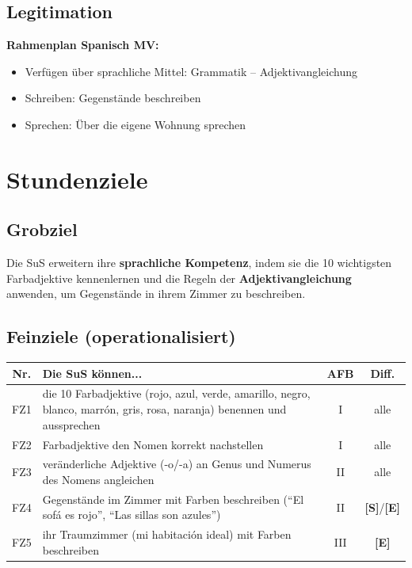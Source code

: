 \documentclass[11pt,a4paper]{article}
\newcommand{\Std}{\textcolor{standard}{\textbf{[S]}}}
\newcommand{\E}{\textcolor{erweiterung}{\textbf{[E]}}}
\begin{document}
\subsection{Legitimation}
\textbf{Rahmenplan Spanisch MV:}
\begin{itemize}
    \item Verfügen über sprachliche Mittel: Grammatik -- Adjektivangleichung
    \item Schreiben: Gegenstände beschreiben
    \item Sprechen: Über die eigene Wohnung sprechen
\end{itemize}

\section{Stundenziele}

\subsection{Grobziel}
Die SuS erweitern ihre \textbf{sprachliche Kompetenz}, indem sie die 10 wichtigsten Farbadjektive kennenlernen und die Regeln der \textbf{Adjektivangleichung} anwenden, um Gegenstände in ihrem Zimmer zu beschreiben.

\subsection{Feinziele (operationalisiert)}
\begin{tabular}{|c|p{8cm}|c|c|}
\hline
\textbf{Nr.} & \textbf{Die SuS können...} & \textbf{AFB} & \textbf{Diff.} \\
\hline
FZ1 & die 10 Farbadjektive (rojo, azul, verde, amarillo, negro, blanco, marrón, gris, rosa, naranja) benennen und aussprechen & I & alle \\
\hline
FZ2 & Farbadjektive den Nomen korrekt nachstellen & I & alle \\
\hline
FZ3 & veränderliche Adjektive (-o/-a) an Genus und Numerus des Nomens angleichen & II & alle \\
\hline
FZ4 & Gegenstände im Zimmer mit Farben beschreiben (``El sofá es rojo'', ``Las sillas son azules'') & II & \Std{}/\E{} \\
\hline
FZ5 & ihr Traumzimmer (mi habitación ideal) mit Farben beschreiben & III & \E{} \\
\hline
\end{tabular}
\end{document}
